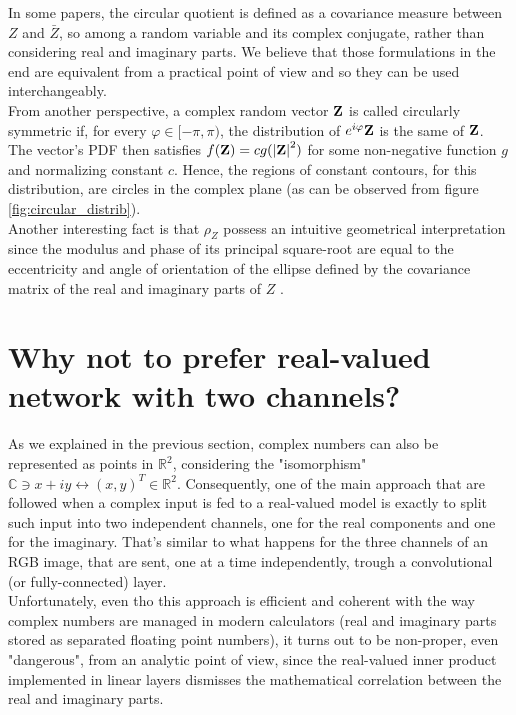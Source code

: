 \documentclass[../main.tex]{subfiles}
\begin{document}
In some papers, the circular quotient is defined as a covariance measure between $Z$ and $\bar{Z}$, so among a random variable and its complex conjugate, rather than considering real and imaginary parts. We believe that those formulations in the end are equivalent from a practical point of view and so they can be used interchangeably.\\
From another perspective, a complex random vector $\vb{Z}$ is called circularly symmetric if, for every $\varphi\in[-\pi,\pi)$, the distribution of $e^{i\varphi}\vb{Z}$ is the same of $\vb{Z}$. The vector's PDF then satisfies $f(\vb{Z})=cg(\abs{\vb{Z}}^2)$ for some non-negative function $g$ and normalizing constant $c$. Hence, the regions of constant contours, for this distribution, are circles in the complex plane (as can be observed from figure \ref{fig:circular_distrib}).\\
Another interesting fact is that $\rho_Z$ possess an intuitive geometrical interpretation since the modulus and phase of its principal square-root are equal to the eccentricity and angle of orientation of the ellipse defined by the covariance matrix of the real and imaginary parts of $Z$ \cite{circularity_geometric_interpretation}.



\section{Why not to prefer real-valued network with two channels?}
As we explained in the previous section, complex numbers can also be represented as points in $\mathds{R}^2$, considering the "isomorphism" $\mathds{C}\ni x+iy \leftrightarrow (x,y)^T\in\mathds{R}^2$. Consequently, one of the main approach that are followed when a complex input is fed to a real-valued model is exactly to split such input into two independent channels, one for the real components and one for the imaginary. That's similar to what happens for the three channels of an RGB image, that are sent, one at a time independently, trough a convolutional (or fully-connected) layer.\\
Unfortunately, even tho this approach is efficient and coherent with the way complex numbers are managed in modern calculators (real and imaginary parts stored as separated floating point numbers), it turns out to be non-proper, even "dangerous", from an analytic point of view, since the real-valued inner product implemented in linear layers dismisses the mathematical correlation between the real and imaginary parts.\\
 
\end{document}
